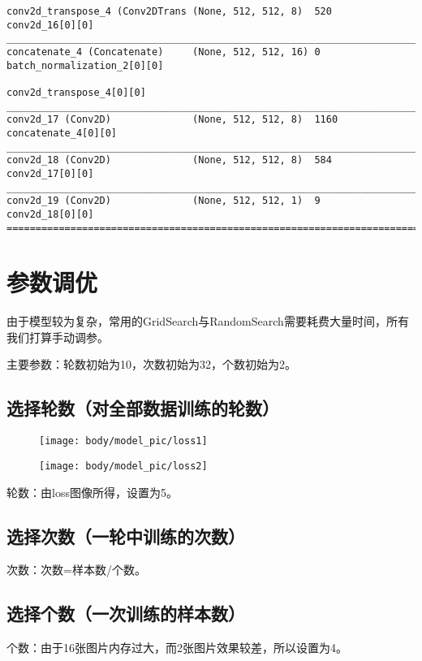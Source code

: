 \begin{verbatim}
conv2d_transpose_4 (Conv2DTrans (None, 512, 512, 8)  520         conv2d_16[0][0]                  
__________________________________________________________________________________________________
concatenate_4 (Concatenate)     (None, 512, 512, 16) 0           batch_normalization_2[0][0]      
                                                                 conv2d_transpose_4[0][0]         
__________________________________________________________________________________________________
conv2d_17 (Conv2D)              (None, 512, 512, 8)  1160        concatenate_4[0][0]              
__________________________________________________________________________________________________
conv2d_18 (Conv2D)              (None, 512, 512, 8)  584         conv2d_17[0][0]                  
__________________________________________________________________________________________________
conv2d_19 (Conv2D)              (None, 512, 512, 1)  9           conv2d_18[0][0]                  
==================================================================================================
\end{verbatim}

\section{参数调优}

由于模型较为复杂，常用的GridSearch与RandomSearch需要耗费大量时间，所有我们打算手动调参。

主要参数：轮数初始为10，次数初始为32，个数初始为2。

\subsection{选择轮数（对全部数据训练的轮数）}

\begin{figure}
\centering
\texttt{[image: body/model\_pic/loss1]}
\caption{}
\end{figure}

\begin{figure}
\centering
\texttt{[image: body/model\_pic/loss2]}
\caption{}
\end{figure}

轮数：由loss图像所得，设置为5。

\subsection{选择次数（一轮中训练的次数）}

次数：次数=样本数/个数。

\subsection{选择个数（一次训练的样本数）}

个数：由于16张图片内存过大，而2张图片效果较差，所以设置为4。
